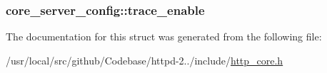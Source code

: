 \subsubsection[{\texorpdfstring{trace\+\_\+enable}{trace_enable}}]{ core\+\_\+server\+\_\+config\+::trace\+\_\+enable}\hypertarget{structcore__server__config_a598d0e04d0dc423c9f5f9a24ca466a5d}{}\label{structcore__server__config_a598d0e04d0dc423c9f5f9a24ca466a5d}


The documentation for this struct was generated from the following file\+:\begin{DoxyCompactItemize}
\item 
/usr/local/src/github/\+Codebase/httpd-\/2../include/\hyperlink{http__core_8h}{http\+\_\+core.\+h}\end{DoxyCompactItemize}
